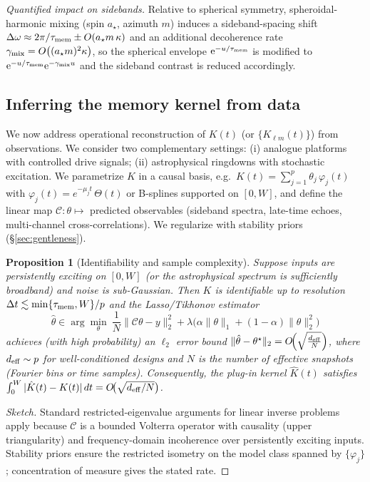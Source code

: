 \documentclass[11pt,a4paper]{article}
\theoremstyle{plain}
\newtheorem{proposition}[theorem]{Proposition}
\theoremstyle{definition}
\theoremstyle{remark}
\begin{document}
\noindent\emph{Quantified impact on sidebands.} Relative to spherical symmetry, spheroidal-harmonic mixing (spin $a_\star$, azimuth $m$) induces a sideband-spacing shift
\(\Delta\omega\approx 2\pi/\tau_{\rm mem} \pm O(a_\star m\,\kappa)\) and an additional decoherence rate
\(\gamma_{\rm mix}=O\big((a_\star m)^2\kappa\big)\), so the spherical envelope $\mathrm{e}^{-u/\tau_{\rm mem}}$ is modified to $\mathrm{e}^{-u/\tau_{\rm mem}}\mathrm{e}^{-\gamma_{\rm mix} u}$ and the sideband contrast is reduced accordingly.

\subsection{Inferring the memory kernel from data}
\label{sec:inference}
We now address operational reconstruction of $K(t)$ (or $\{K_{\ell m}(t)\}$) from observations. We consider two complementary
settings: (i) analogue platforms with controlled drive signals; (ii) astrophysical ringdowns with stochastic excitation.
We parametrize $K$ in a causal basis, e.g.\ $K(t)=\sum_{j=1}^{p}\theta_j\,\varphi_j(t)$ with $\varphi_j(t)=e^{-\mu_j t}\,\Theta(t)$
or B-splines supported on $[0,W]$, and define the linear map $\mathcal{C}:\theta\mapsto$ predicted observables (sideband spectra,
late-time echoes, multi-channel cross-correlations). We regularize with stability priors (\S\ref{sec:gentleness}).

\begin{proposition}[Identifiability and sample complexity]\label{prop:identifiability}
Suppose inputs are persistently exciting on $[0,W]$ (or the astrophysical spectrum is sufficiently broadband) and noise is sub-Gaussian.
Then $K$ is identifiable up to resolution $\Delta t\lesssim \min\{\tau_{\rm mem},W\}/p$ and the Lasso/Tikhonov estimator
\begin{equation}
\hat\theta \in \arg\min_{\theta}\ \frac{1}{N}\|\mathcal{C}\theta-y\|_2^2+\lambda\big(\alpha\|\theta\|_1+(1-\alpha)\|\theta\|_2^2\big)
\end{equation}
achieves (with high probability) an $\ell_2$ error bound $\|\hat\theta-\theta^\star\|_2 = O\!\Big(\sqrt{\tfrac{d_{\rm eff}}{N}}\Big)$,
where $d_{\rm eff}\sim p$ for well-conditioned designs and $N$ is the number of effective snapshots (Fourier bins or time samples).
Consequently, the plug-in kernel $\hat K(t)$ satisfies $\int_0^W|\hat K(t)-K(t)|\,dt=O\!\big(\sqrt{d_{\rm eff}/N}\big)$.
\end{proposition}
\begin{proof}[Sketch]
Standard restricted-eigenvalue arguments for linear inverse problems apply because $\mathcal{C}$ is a bounded Volterra operator with
causality (upper triangularity) and frequency-domain incoherence over persistently exciting inputs. Stability priors ensure the
restricted isometry on the model class spanned by $\{\varphi_j\}$; concentration of measure gives the stated rate.
\end{proof}
\end{document}

